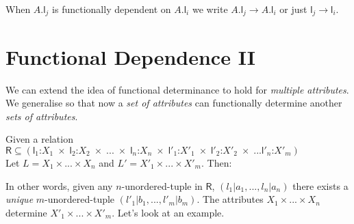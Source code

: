 \frmrule




When $A.\textsf{l}_j$ is functionally dependent on $A.\textsf{l}_i$ 
we write $A.\textsf{l}_j \rightarrow A.\textsf{l}_i$ or 
just $\textsf{l}_j \rightarrow \textsf{l}_i$.

\frmrule

\frmrule


\section{Functional Dependence II}

We can extend the idea of functional determinance to hold for 
\textit{multiple attributes}. We generalise so that now 
a \textit{set of attributes} can functionally determine 
another \textit{sets of attributes}.

Given a relation 
$\textsf{R} 
\subseteq 
(
\textsf{l}_1\text{:}X_1 \;\times\; 
\textsf{l}_2\text{:}X_2 \;\times\; 
... \;\times\; 
\textsf{l}_n\text{:}X_n \;\times\; 
\textsf{l}'_1\text{:}X'_1 \;\times\; 
\textsf{l}'_2\text{:}X'_2 \;\times\; 
...
\textsf{l}'_n\text{:}X'_m
)
$ 
\\
Let $L = X_1 \times ... \times X_n$ 
and $L' = X'_1 \times ... \times X'_m$. Then:


In other words, given any $n$-unordered-tuple in $\textsf{R}$, $(l_1|a_1, ..., l_n|a_n)$ there exists 
a \textit{unique} $m$-unordered-tuple $(l'_1|b_1, ..., l'_m|b_m)$. 
The attributes $X_1 \times ... \times X_n$ determine $X'_1 \times ... \times X'_m$.
Let's look at an example.

\frmrule
 
